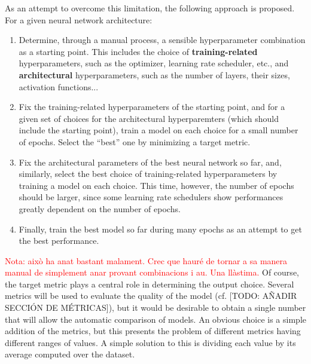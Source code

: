 \documentclass[twocolumn,twoside,a4paper,10pt]{IEEEtran}
\newcommand{\Frank}[1]{\textcolor{red}{#1}}
\begin{document}
As an attempt to overcome this limitation, the following approach is proposed. For a given neural network architecture:
\begin{enumerate}
  \item Determine, through a manual process, a sensible hyperparameter combination as a starting point. This includes the choice of \textbf{training-related} hyperparameters, such as the optimizer, learning rate scheduler, etc., and \textbf{architectural} hyperparameters, such as the number of layers, their sizes, activation functions...
  \item Fix the training-related hyperparameters of the starting point, and for a given set of choices for the architectural hyperparemters (which should include the starting point), train a model on each choice for a small number of epochs. Select the ``best'' one by minimizing a target metric.
  \item Fix the architectural parameters of the best neural network so far, and, similarly, select the best choice of training-related hyperparameters by training a model on each choice. This time, however, the number of epochs should be larger, since some learning rate schedulers show performances greatly dependent on the number of epochs.
  \item Finally, train the best model so far during many epochs as an attempt to get the best performance.
\end{enumerate}
\Frank{Nota: això ha anat bastant malament. Crec que hauré de tornar a sa manera manual de simplement anar provant combinacions i au. Una llàstima.}
Of course, the target metric plays a central role in determining the output choice. Several metrics will be used to evaluate the quality of the model (cf. [TODO: AÑADIR SECCIÓN DE MÉTRICAS]), but it would be desirable to obtain a single number that will allow the automatic comparison of models. An obvious choice is a simple addition of the metrics, but this presents the problem of different metrics having different ranges of values. A simple solution to this
is dividing each value by its average computed over the dataset.
\end{document}
